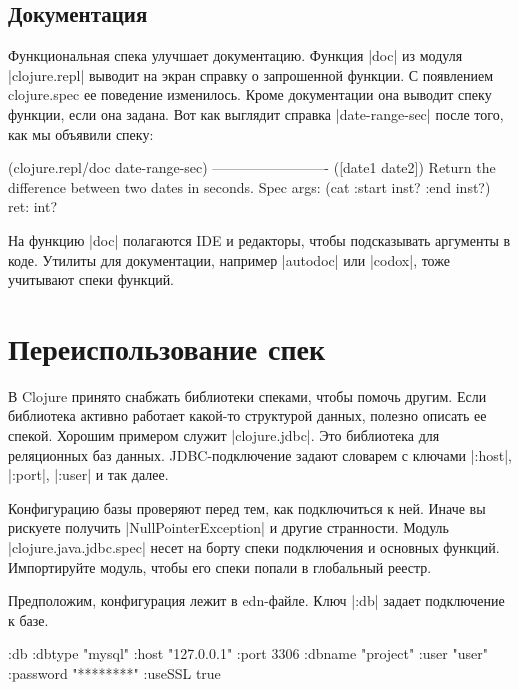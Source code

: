 \subsection{Документация}

Функциональная спека улучшает документацию. Функция \spverb|doc| из модуля
\spverb|clojure.repl| выводит на экран справку о запрошенной функции. С
появлением clojure.spec ее поведение изменилось. Кроме документации она выводит
спеку функции, если она задана. Вот как выглядит справка \spverb|date-range-sec|
после того, как мы объявили спеку:

\begin{english}
  \begin{clojure}
(clojure.repl/doc date-range-sec)
-------------------------
([date1 date2])
  Return the difference between two dates in seconds.
Spec
  args: (cat :start inst? :end inst?)
  ret: int?
  \end{clojure}
\end{english}

На функцию \spverb|doc| полагаются IDE и редакторы, чтобы подсказывать аргументы
в коде. Утилиты для документации, например \spverb|autodoc| или \spverb|codox|,
тоже учитывают спеки функций.

\section{Переиспользование спек}

В Clojure принято снабжать библиотеки спеками, чтобы помочь другим. Если
библиотека активно работает какой-то структурой данных, полезно описать ее
спекой. Хорошим примером служит \spverb|clojure.jdbc|.
Это библиотека для реляционных баз данных. JDBC-подключение задают словарем с ключами
\spverb|:host|, \spverb|:port|, \spverb|:user| и так далее.

Конфигурацию базы проверяют перед тем, как подключиться к ней. Иначе вы рискуете
получить \spverb|NullPointerException| и другие странности. Модуль
\spverb|clojure.java.jdbc.spec| несет на борту спеки подключения и основных
функций. Импортируйте модуль, чтобы его спеки попали в глобальный реестр.

Предположим, конфигурация лежит в edn-файле. Ключ \spverb|:db| задает
подключение к базе.

\begin{english}
  \begin{clojure}
{:db {:dbtype "mysql"
      :host "127.0.0.1"
      :port 3306
      :dbname "project"
      :user "user"
      :password "********"
      :useSSL true}}
  \end{clojure}
\end{english}


